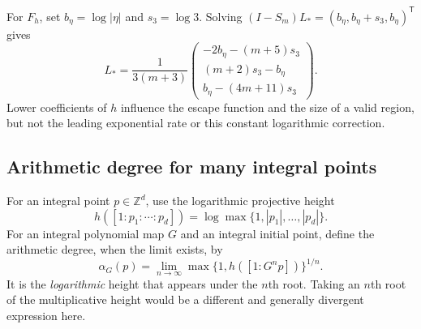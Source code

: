 \documentclass[11pt,a4paper]{article}
\numberwithin{equation}{section}
\theoremstyle{definition}
\theoremstyle{remark}
\newcommand{\Z}{\mathbb Z}
\begin{document}
For $F_h$, set $b_\eta=\log|\eta|$ and $s_3=\log3$. Solving
$(I-S_m)L_*= (b_\eta,b_\eta+s_3,b_\eta)^\mathsf T$ gives
\begin{equation}
 L_*=
 \frac1{3(m+3)}
 \begin{pmatrix}
 -2b_\eta-(m+5)s_3\\
 (m+2)s_3-b_\eta\\
 b_\eta-(4m+11)s_3
 \end{pmatrix}.
 \label{kmd:eq:shear-Lstar}
\end{equation}
Lower coefficients of $h$ influence the escape function and the
size of a valid region, but not the leading exponential rate or
this constant logarithmic correction.

\subsection{Arithmetic degree for many integral points}
For an integral point $p\in\Z^d$, use the logarithmic projective
height
\[
 h([1:p_1:\cdots:p_d])=\log\max\{1,|p_1|,\ldots,|p_d|\}.
\]
For an integral polynomial map $G$ and an integral initial point,
define the arithmetic degree, when the limit exists, by
\begin{equation}
 \alpha_G(p)=\lim_{n\to\infty}
 \max\{1,h([1:G^np])\}^{1/n}.
 \label{kmd:eq:arithmetic-degree}
\end{equation}
It is the \emph{logarithmic} height that appears under the $n$th
root. Taking an $n$th root of the multiplicative height would be
a different and generally divergent expression here.
\end{document}
